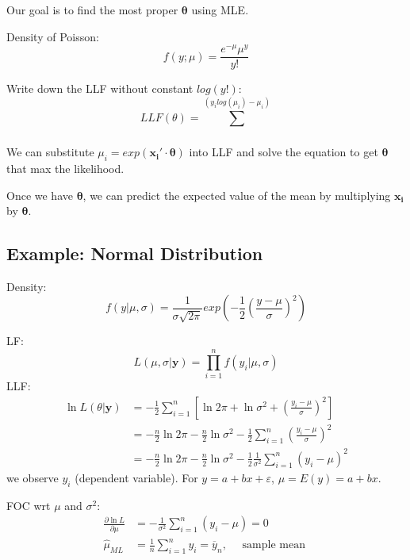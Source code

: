 \documentclass[12pt]{article}
\begin{document}
Our goal is to find the most proper $ \bm{\theta} $ using MLE.

Density of Poisson:
\begin{equation*}
		f(y;\mu) = \frac{e^{ - \mu} \mu^{y}}{y!}
\end{equation*}

Write down the LLF without constant $ log(y!) $:
\begin{equation*}
LLF(\theta) = \sum\limits_{} ^	(y_{i}log(\mu_{i}) - \mu_{i})
\end{equation*}

We can substitute $ \mu_{i} = exp(\bm{x_{i}}' \cdot \bm{\theta}) $ into LLF and solve
the equation to get $ \bm{\theta} $ that max the likelihood.

Once we have $ \bm{\theta} $, we can predict the expected value of the mean by
multiplying $ \bm{x_{i}} $ by $ \bm{\theta} $.







\subsection{Example: Normal Distribution}

Density:
\begin{equation*}
		f(y|\mu, \sigma) = \frac{1}{\sigma \sqrt{2 \pi}} exp \left(- \frac{1}{2} \left( 
				\frac{y - \mu}{\sigma}
				\right)^{2} \right)
\end{equation*}

LF:
\begin{equation*}
L(\mu,\sigma | \bm{y}) = \prod_{i = 1} ^ n f(y_{i}|\mu,\sigma)
\end{equation*}
LLF:
\begin{align*}
\ln L(\theta|\bm{y}) &=  - \frac{1}{2} \sum\limits_{i = 1} ^n
\left[ \ln 2 \pi  + \ln \sigma^{2} + 
\left( \frac{y_{i} - \mu}{\sigma} \right)^{2} \right] \\
&=  - \frac{n}{2}\ln 2 \pi -\frac{n}{2} \ln \sigma^{2}- \frac{1}{2}\sum\limits_{i = 1} ^n
 \left( \frac{y_{i} - \mu}{\sigma} \right) ^{2}\\
&=  - \frac{n}{2} \ln 2 \pi -\frac{n}{2}\ln \sigma^{2} - \frac{1}{2}\frac{1}{\sigma^{2}}
\sum\limits_{i = 1} ^n (y_{i} - \mu)^{2}	
\end{align*}
we observe $ y_{i} $ (dependent variable). 
For $ y = a + bx + \varepsilon $, $ \mu = E(y) = a + bx $.


FOC wrt $ \mu $ and $ \sigma^{2} $:
\begin{align*}
\frac{\partial \ln L }{\partial \mu }  &=  - \frac{1}{\sigma^{2}}
\sum\limits_{i = 1} ^n (y_{i} - \mu)	= 0\\
\widehat{\mu}_{ML} &= \frac{1}{n}\sum\limits_{i = 1} ^n y_{i} =  \overline{y}_{n},	\quad
 \text{ sample mean }
\end{align*}
\end{document}
